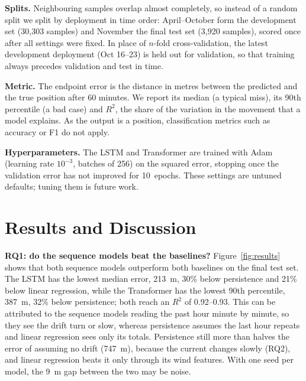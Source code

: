 \documentclass[sigconf]{acmart}
\begin{document}
\textbf{Splits.} Neighbouring samples overlap almost completely, so instead of a random split we split by deployment in time order: April--October form the development set (30{,}303 samples) and November the final test set (3{,}920 samples), scored once after all settings were fixed. In place of $n$-fold cross-validation, the latest development deployment (Oct 16--23) is held out for validation, so that training always precedes validation and test in time.

\textbf{Metric.} The endpoint error is the distance in metres between the predicted and the true position after 60 minutes. We report its median (a typical miss), its 90th percentile (a bad case) and $R^2$, the share of the variation in the movement that a model explains. As the output is a position, classification metrics such as accuracy or F1 do not apply.

\textbf{Hyperparameters.} The LSTM and Transformer are trained with Adam~\cite{kingma2015adam} (learning rate $10^{-3}$, batches of 256) on the squared error, stopping once the validation error has not improved for 10~epochs. These settings are untuned defaults; tuning them is future work.

\section{Results and Discussion}





\textbf{RQ1: do the sequence models beat the baselines?} Figure~\ref{fig:results} shows that both sequence models outperform both baselines on the final test set. The LSTM has the lowest median error, 213~m, 30\% below persistence and 21\% below linear regression, while the Transformer has the lowest 90th percentile, 387~m, 32\% below persistence; both reach an $R^2$ of 0.92--0.93. This can be attributed to the sequence models reading the past hour minute by minute, so they see the drift turn or slow, whereas persistence assumes the last hour repeats and linear regression sees only its totals. Persistence still more than halves the error of assuming no drift (747~m), because the current changes slowly (RQ2), and linear regression beats it only through its wind features. With one seed per model, the 9~m gap between the two may be noise.
\end{document}
